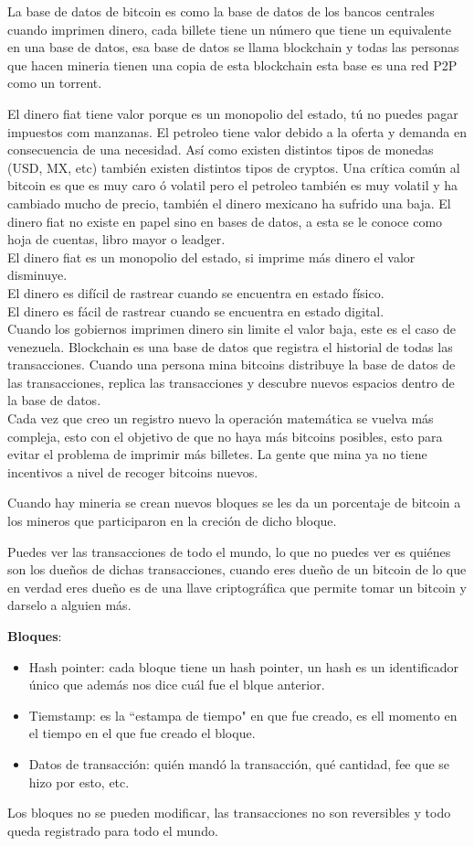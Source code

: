 \documentclass[a4paper,12pt]{lib/pub}
\begin{document}
La base de datos de bitcoin es como la base de datos de los bancos centrales cuando imprimen dinero, cada billete tiene un número que tiene un equivalente en una base de datos, esa base de datos se llama blockchain y todas las personas que hacen mineria tienen una copia de esta blockchain esta base es una red P2P como un torrent.

El dinero fiat tiene valor porque es un monopolio del estado, tú no puedes pagar impuestos com manzanas.
El petroleo tiene valor debido a la oferta y demanda en consecuencia de una necesidad.
Así como existen distintos tipos de monedas (USD, MX, etc) también existen distintos tipos de cryptos.
Una crítica común al bitcoin es que es muy caro ó volatil pero el petroleo también es muy volatil y ha cambiado mucho de precio, también el dinero mexicano ha sufrido una baja.
El dinero fiat no existe en papel sino en bases de datos, a esta se le conoce como hoja de cuentas, libro mayor o leadger.\\
El dinero fiat es un monopolio del estado, si imprime más dinero el valor disminuye.\\
El dinero es difícil de rastrear cuando se encuentra en estado físico.\\
El dinero es fácil de rastrear cuando se encuentra en estado digital.\\

Cuando los gobiernos imprimen dinero sin limite el valor baja, este es el caso de venezuela.
Blockchain es una base de datos que registra el historial de todas las transacciones.
Cuando una persona mina bitcoins distribuye la base de datos de las transacciones, replica las transacciones y descubre nuevos espacios dentro de la base de datos.\\
Cada vez que creo un registro nuevo la operación matemática se vuelva más compleja, esto con el objetivo de que no haya más bitcoins posibles, esto para evitar el problema de imprimir más billetes. La gente que mina ya no tiene incentivos a nivel de recoger bitcoins nuevos.

Cuando hay mineria se crean nuevos bloques se les da un porcentaje de bitcoin a los mineros que participaron en la creción de dicho bloque.

Puedes ver las transacciones de todo el mundo, lo que no puedes ver es quiénes son los dueños de dichas transacciones, cuando eres dueño de un bitcoin de lo que en verdad eres dueño es de una llave criptográfica que permite tomar un bitcoin y darselo a alguien más.

\textbf{Bloques}:
\begin{itemize}
\item Hash pointer: cada bloque tiene un hash pointer, un hash es un identificador único que además nos dice cuál fue el blque anterior.
\item Tiemstamp: es la ``estampa de tiempo" en que fue creado, es ell momento en el tiempo en el que fue creado el bloque.
\item Datos de transacción: quién mandó la transacción, qué cantidad, fee que se hizo por esto, etc.
\end{itemize}
Los bloques no se pueden modificar, las transacciones no son reversibles y todo queda registrado para todo el mundo.
\end{document}
